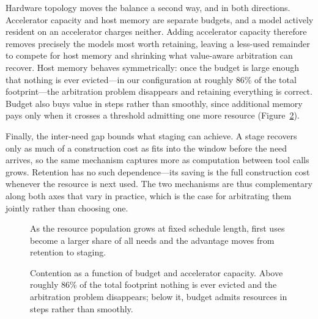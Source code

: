 Hardware topology moves the balance a second way, and in both directions.
Accelerator capacity and host memory are separate budgets, and a model
actively resident on an accelerator charges neither. Adding accelerator
capacity therefore removes precisely the models most worth retaining, leaving
a less-used remainder to compete for host memory and shrinking what
value-aware arbitration can recover.  %
Host memory behaves symmetrically: once the budget is large enough that
nothing is ever evicted---in our configuration at roughly 86\% of the total
footprint---the arbitration problem disappears and retaining everything is
correct.  %
Budget also buys value in steps rather than smoothly, since additional memory
pays only when it crosses a threshold admitting one more resource
(Figure~\ref{fig:topology-budget}).

Finally, the inter-need gap bounds what staging can achieve. A stage recovers
only as much of a construction cost as fits into the window before the need
arrives, so the same mechanism captures more as computation between tool calls
grows.  %
Retention has no such dependence---its saving is the full construction cost
whenever the resource is next used. The two mechanisms are thus complementary
along both axes that vary in practice, which is the case for arbitrating them
jointly rather than choosing one.  %

\begin{figure}[t]
\centering
{}
\caption{As the resource population grows at fixed schedule length, first uses
become a larger share of all needs and the advantage moves from retention to
staging.}
\label{fig:scale-sweep}
\end{figure}

\begin{figure}[t]
\centering
{}
\caption{Contention as a function of budget and accelerator capacity. Above
roughly 86\% of the total footprint nothing is ever evicted and the
arbitration problem disappears; below it, budget admits resources in steps
rather than smoothly.}
\label{fig:topology-budget}
\end{figure}

